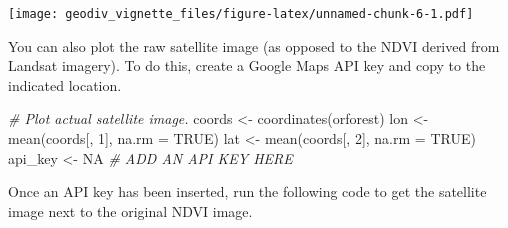 \documentclass[
]{article}
\newenvironment{Shaded}{\begin{snugshade}}{\end{snugshade}}
\newcommand{\AttributeTok}[1]{\textcolor[rgb]{0.77,0.63,0.00}{#1}}
\newcommand{\CommentTok}[1]{\textcolor[rgb]{0.56,0.35,0.01}{\textit{#1}}}
\newcommand{\ConstantTok}[1]{\textcolor[rgb]{0.00,0.00,0.00}{#1}}
\newcommand{\DecValTok}[1]{\textcolor[rgb]{0.00,0.00,0.81}{#1}}
\newcommand{\FunctionTok}[1]{\textcolor[rgb]{0.00,0.00,0.00}{#1}}
\newcommand{\NormalTok}[1]{#1}
\newcommand{\OtherTok}[1]{\textcolor[rgb]{0.56,0.35,0.01}{#1}}
\begin{document}
\texttt{[image: geodiv\_vignette\_files/figure-latex/unnamed-chunk-6-1.pdf]}

You can also plot the raw satellite image (as opposed to the NDVI
derived from Landsat imagery). To do this, create a Google Maps API key
and copy to the indicated location.

\begin{Shaded}
\begin{Highlighting}[]
\CommentTok{\# Plot actual satellite image.}
\NormalTok{coords }\OtherTok{\textless{}{-}} \FunctionTok{coordinates}\NormalTok{(orforest)}
\NormalTok{lon }\OtherTok{\textless{}{-}} \FunctionTok{mean}\NormalTok{(coords[, }\DecValTok{1}\NormalTok{], }\AttributeTok{na.rm =} \ConstantTok{TRUE}\NormalTok{)}
\NormalTok{lat }\OtherTok{\textless{}{-}} \FunctionTok{mean}\NormalTok{(coords[, }\DecValTok{2}\NormalTok{], }\AttributeTok{na.rm =} \ConstantTok{TRUE}\NormalTok{)}
\NormalTok{api\_key }\OtherTok{\textless{}{-}} \ConstantTok{NA} \CommentTok{\# ADD AN API KEY HERE}
\end{Highlighting}
\end{Shaded}

Once an API key has been inserted, run the following code to get the
satellite image next to the original NDVI image.
\end{document}
